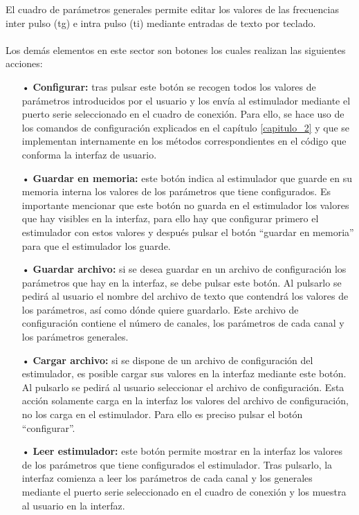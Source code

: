 El cuadro de parámetros generales permite editar los valores de las frecuencias inter pulso (tg) e intra pulso (ti) mediante entradas de texto por teclado.
\\
\\
Los demás elementos en este sector son botones los cuales realizan las siguientes acciones:
\begin{itemize}
\item[•] \textbf{Configurar:} tras pulsar este botón se recogen todos los valores de parámetros introducidos por el usuario y los envía al estimulador mediante el puerto serie seleccionado en el cuadro de conexión. Para ello, se hace uso de los comandos de configuración explicados en el capítulo \ref{capitulo_2} y que se implementan internamente en los métodos correspondientes en el código que conforma la interfaz de usuario.
\item[•] \textbf{Guardar en memoria:} este botón indica al estimulador que guarde en su memoria interna los valores de los parámetros que tiene configurados. 
Es importante mencionar que este botón no guarda en el estimulador los valores que hay visibles en la interfaz, para ello hay que configurar primero el estimulador con estos valores y después pulsar el botón ``guardar en memoria'' para que el estimulador los guarde.
\item[•] \textbf{Guardar archivo:} si se desea guardar en un archivo de configuración los parámetros que hay en la interfaz, se debe pulsar este botón. Al pulsarlo se pedirá al usuario el nombre del archivo de texto que contendrá los valores de los parámetros, así como dónde quiere guardarlo. Este archivo de configuración contiene el número de canales, los parámetros de cada canal y los parámetros generales.
\item[•] \textbf{Cargar archivo:} si se dispone de un archivo de configuración del estimulador, es posible cargar sus valores en la interfaz mediante este botón. Al pulsarlo se pedirá al usuario seleccionar el archivo de configuración. 
Esta acción solamente carga en la interfaz los valores del archivo de configuración, no los carga en el estimulador. Para ello es preciso pulsar el botón ``configurar''.
\item[•] \textbf{Leer estimulador:} este botón permite mostrar en la interfaz los valores de los parámetros que tiene configurados el estimulador. Tras pulsarlo, la interfaz comienza a leer los parámetros de cada canal y los generales mediante el puerto serie seleccionado en el cuadro de conexión y los muestra al usuario en la interfaz.
\end{itemize}

